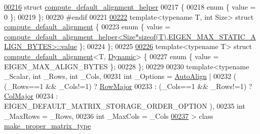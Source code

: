 \begin{DoxyCode}
{\hyperlink{struct_eigen_1_1internal_1_1compute__default__alignment__helper}{00216} \textcolor{keyword}{struct }\hyperlink{struct_eigen_1_1internal_1_1compute__default__alignment__helper}{compute\_default\_alignment\_helper}
00217 \{
00218   \textcolor{keyword}{enum} \{ value = 0 \};
00219 \};
00220 \textcolor{preprocessor}{#endif}
00221 
\hyperlink{struct_eigen_1_1internal_1_1compute__default__alignment}{00222} \textcolor{keyword}{template}<\textcolor{keyword}{typename} T, \textcolor{keywordtype}{int} Size> \textcolor{keyword}{struct }\hyperlink{struct_eigen_1_1internal_1_1compute__default__alignment}{compute\_default\_alignment} \{
00223   \textcolor{keyword}{enum} \{ value = 
      \hyperlink{struct_eigen_1_1internal_1_1compute__default__alignment__helper}{compute\_default\_alignment\_helper<Size*sizeof(T),EIGEN\_MAX\_STATIC\_ALIGN\_BYTES>::value}
       \};
00224 \};
00225 
\hyperlink{struct_eigen_1_1internal_1_1compute__default__alignment_3_01_t_00_01_dynamic_01_4}{00226} \textcolor{keyword}{template}<\textcolor{keyword}{typename} T> \textcolor{keyword}{struct }\hyperlink{struct_eigen_1_1internal_1_1compute__default__alignment}{compute\_default\_alignment}<T,
      \hyperlink{namespace_eigen_ad81fa7195215a0ce30017dfac309f0b2}{Dynamic}> \{
00227   \textcolor{keyword}{enum} \{ value = EIGEN\_MAX\_ALIGN\_BYTES \};
00228 \};
00229 
00230 \textcolor{keyword}{template}<\textcolor{keyword}{typename} \_Scalar, \textcolor{keywordtype}{int} \_Rows, \textcolor{keywordtype}{int} \_Cols,
00231          \textcolor{keywordtype}{int} \_Options = \hyperlink{group__enums_ggaacded1a18ae58b0f554751f6cdf9eb13a28d63c0dd8560827162decfd898804f4}{AutoAlign} |
00232                           ( (\_Rows==1 && \_Cols!=1) ? \hyperlink{group__enums_ggaacded1a18ae58b0f554751f6cdf9eb13acfcde9cd8677c5f7caf6bd603666aae3}{RowMajor}
00233                           : (\_Cols==1 && \_Rows!=1) ? \hyperlink{group__enums_ggaacded1a18ae58b0f554751f6cdf9eb13a0cbd4bdd0abcfc0224c5fcb5e4f6669a}{ColMajor}
00234                           : EIGEN\_DEFAULT\_MATRIX\_STORAGE\_ORDER\_OPTION ),
00235          \textcolor{keywordtype}{int} \_MaxRows = \_Rows,
00236          \textcolor{keywordtype}{int} \_MaxCols = \_Cols
\hyperlink{class_eigen_1_1internal_1_1make__proper__matrix__type}{00237} > \textcolor{keyword}{class} \hyperlink{class_eigen_1_1internal_1_1make__proper__matrix__type}{make\_proper\_matrix\_type}
}
\end{DoxyCode}
